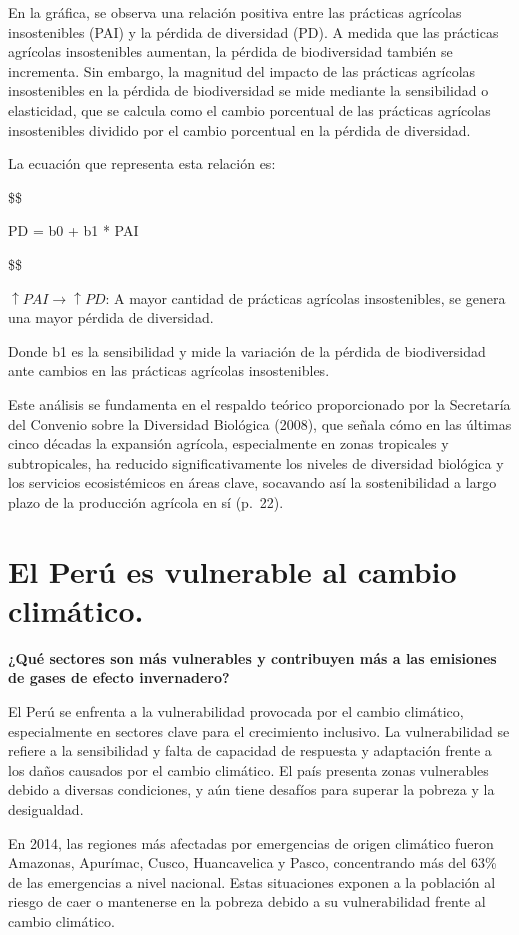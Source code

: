 \documentclass[
  stu,
  floatsintext,
  longtable,
  a4paper,
  nolmodern,
  notxfonts,
  notimes,
  12pt,
  colorlinks=true,linkcolor=blue,citecolor=blue,urlcolor=blue]{apa7}
\begin{document}
En la gráfica, se observa una relación positiva entre las prácticas
agrícolas insostenibles (PAI) y la pérdida de diversidad (PD). A medida
que las prácticas agrícolas insostenibles aumentan, la pérdida de
biodiversidad también se incrementa. Sin embargo, la magnitud del
impacto de las prácticas agrícolas insostenibles en la pérdida de
biodiversidad se mide mediante la sensibilidad o elasticidad, que se
calcula como el cambio porcentual de las prácticas agrícolas
insostenibles dividido por el cambio porcentual en la pérdida de
diversidad.

La ecuación que representa esta relación es:

\$\$

PD = b0 + b1 * PAI

\$\$

\(↑PAI → ↑PD\): A mayor cantidad de prácticas agrícolas insostenibles,
se genera una mayor pérdida de diversidad.

Donde b1 es la sensibilidad y mide la variación de la pérdida de
biodiversidad ante cambios en las prácticas agrícolas insostenibles.

Este análisis se fundamenta en el respaldo teórico proporcionado por la
Secretaría del Convenio sobre la Diversidad Biológica (2008), que señala
cómo en las últimas cinco décadas la expansión agrícola, especialmente
en zonas tropicales y subtropicales, ha reducido significativamente los
niveles de diversidad biológica y los servicios ecosistémicos en áreas
clave, socavando así la sostenibilidad a largo plazo de la producción
agrícola en sí (p.~22).

\section{El Perú es vulnerable al cambio
climático.}\label{el-peruxfa-es-vulnerable-al-cambio-climuxe1tico.}

\textbf{¿Qué sectores son más vulnerables y contribuyen más a las
emisiones de gases de efecto invernadero?}

El Perú se enfrenta a la vulnerabilidad provocada por el cambio
climático, especialmente en sectores clave para el crecimiento
inclusivo. La vulnerabilidad se refiere a la sensibilidad y falta de
capacidad de respuesta y adaptación frente a los daños causados por el
cambio climático. El país presenta zonas vulnerables debido a diversas
condiciones, y aún tiene desafíos para superar la pobreza y la
desigualdad.

En 2014, las regiones más afectadas por emergencias de origen climático
fueron Amazonas, Apurímac, Cusco, Huancavelica y Pasco, concentrando más
del 63\% de las emergencias a nivel nacional. Estas situaciones exponen
a la población al riesgo de caer o mantenerse en la pobreza debido a su
vulnerabilidad frente al cambio climático.
\end{document}
